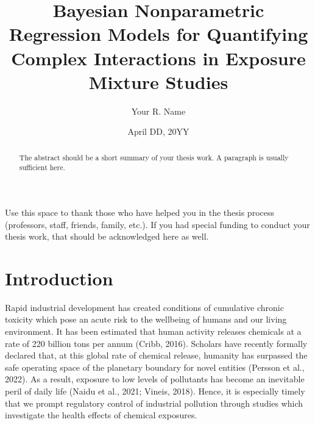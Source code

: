 \documentclass[12pt, twoside]{amherstthesis}
\title{Bayesian Nonparametric Regression Models for Quantifying Complex Interactions in Exposure Mixture Studies}
\author{Your R. Name}
\date{April DD, 20YY}
\begin{document}
\doublespace
  \maketitle

\frontmatter %
\pagestyle{fancyplain}

  \begin{abstract}
    The abstract should be a short summary of your thesis work. A paragraph is usually sufficient here.
  \end{abstract}
  \begin{acknowledgments}
    Use this space to thank those who have helped you in the thesis process (professors, staff, friends, family, etc.). If you had special funding to conduct your thesis work, that should be acknowledged here as well.
  \end{acknowledgments}

  \hypersetup{linkcolor=black}
  \setcounter{tocdepth}{2}
  \tableofcontents

  \listoftables

  \listoffigures


\mainmatter %
\pagestyle{fancyplain} %

\hypertarget{intro}{%
\chapter{Introduction}\label{intro}}

Rapid industrial development has created conditions of cumulative chronic toxicity which pose an acute risk to the wellbeing of humans and our living environment. It has been estimated that human activity releases chemicals at a rate of 220 billion tons per annum (Cribb, 2016). Scholars have recently formally declared that, at this global rate of chemical release, humanity has surpassed the safe operating space of the planetary boundary for novel entities (Persson et al., 2022). As a result, exposure to low levels of pollutants has become an inevitable peril of daily life (Naidu et al., 2021; Vineis, 2018). Hence, it is especially timely that we prompt regulatory control of industrial pollution through studies which investigate the health effects of chemical exposures.
\end{document}
